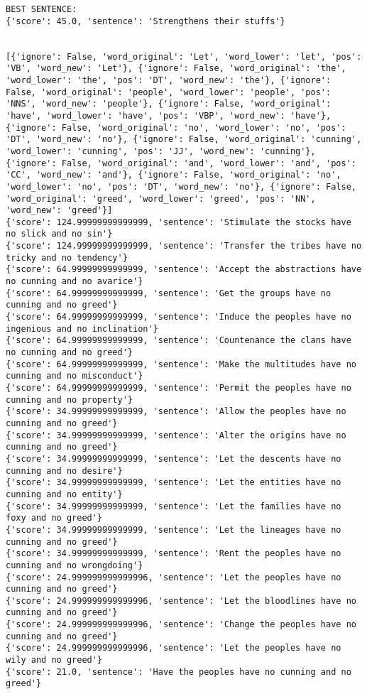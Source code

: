 \documentclass[12pt,a4paper,oneside]{book}
\begin{document}
\begin{verbatim}
BEST SENTENCE:
{'score': 45.0, 'sentence': 'Strengthens their stuffs'}


[{'ignore': False, 'word_original': 'Let', 'word_lower': 'let', 'pos': 'VB', 'word_new': 'Let'}, {'ignore': False, 'word_original': 'the', 'word_lower': 'the', 'pos': 'DT', 'word_new': 'the'}, {'ignore': False, 'word_original': 'people', 'word_lower': 'people', 'pos': 'NNS', 'word_new': 'people'}, {'ignore': False, 'word_original': 'have', 'word_lower': 'have', 'pos': 'VBP', 'word_new': 'have'}, {'ignore': False, 'word_original': 'no', 'word_lower': 'no', 'pos': 'DT', 'word_new': 'no'}, {'ignore': False, 'word_original': 'cunning', 'word_lower': 'cunning', 'pos': 'JJ', 'word_new': 'cunning'}, {'ignore': False, 'word_original': 'and', 'word_lower': 'and', 'pos': 'CC', 'word_new': 'and'}, {'ignore': False, 'word_original': 'no', 'word_lower': 'no', 'pos': 'DT', 'word_new': 'no'}, {'ignore': False, 'word_original': 'greed', 'word_lower': 'greed', 'pos': 'NN', 'word_new': 'greed'}]
{'score': 124.99999999999999, 'sentence': 'Stimulate the stocks have no slick and no sin'}
{'score': 124.99999999999999, 'sentence': 'Transfer the tribes have no tricky and no tendency'}
{'score': 64.99999999999999, 'sentence': 'Accept the abstractions have no cunning and no avarice'}
{'score': 64.99999999999999, 'sentence': 'Get the groups have no cunning and no greed'}
{'score': 64.99999999999999, 'sentence': 'Induce the peoples have no ingenious and no inclination'}
{'score': 64.99999999999999, 'sentence': 'Countenance the clans have no cunning and no greed'}
{'score': 64.99999999999999, 'sentence': 'Make the multitudes have no cunning and no misconduct'}
{'score': 64.99999999999999, 'sentence': 'Permit the peoples have no cunning and no property'}
{'score': 34.99999999999999, 'sentence': 'Allow the peoples have no cunning and no greed'}
{'score': 34.99999999999999, 'sentence': 'Alter the origins have no cunning and no greed'}
{'score': 34.99999999999999, 'sentence': 'Let the descents have no cunning and no desire'}
{'score': 34.99999999999999, 'sentence': 'Let the entities have no cunning and no entity'}
{'score': 34.99999999999999, 'sentence': 'Let the families have no foxy and no greed'}
{'score': 34.99999999999999, 'sentence': 'Let the lineages have no cunning and no greed'}
{'score': 34.99999999999999, 'sentence': 'Rent the peoples have no cunning and no wrongdoing'}
{'score': 24.999999999999996, 'sentence': 'Let the peoples have no cunning and no greed'}
{'score': 24.999999999999996, 'sentence': 'Let the bloodlines have no cunning and no greed'}
{'score': 24.999999999999996, 'sentence': 'Change the peoples have no cunning and no greed'}
{'score': 24.999999999999996, 'sentence': 'Let the peoples have no wily and no greed'}
{'score': 21.0, 'sentence': 'Have the peoples have no cunning and no greed'}


\end{verbatim}
\end{document}
